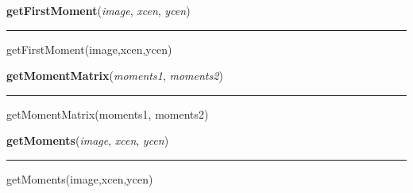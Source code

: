     \label{multireg:chainMoments:getFirstMoment}
    \vspace{0.5ex}

    \begin{boxedminipage}{\textwidth}

    \raggedright \textbf{getFirstMoment}(\textit{image}, \textit{xcen}, \textit{ycen})

    \vspace{-1.5ex}

    \rule{\textwidth}{0.5\fboxrule}
    getFirstMoment(image,xcen,ycen)

    \vspace{1ex}

    \end{boxedminipage}

    \label{multireg:chainMoments:getMomentMatrix}
    \vspace{0.5ex}

    \begin{boxedminipage}{\textwidth}

    \raggedright \textbf{getMomentMatrix}(\textit{moments1}, \textit{moments2})

    \vspace{-1.5ex}

    \rule{\textwidth}{0.5\fboxrule}
    getMomentMatrix(moments1, moments2)

    \vspace{1ex}

    \end{boxedminipage}

    \label{multireg:chainMoments:getMoments}
    \vspace{0.5ex}

    \begin{boxedminipage}{\textwidth}

    \raggedright \textbf{getMoments}(\textit{image}, \textit{xcen}, \textit{ycen})

    \vspace{-1.5ex}

    \rule{\textwidth}{0.5\fboxrule}
    getMoments(image,xcen,ycen)

    \vspace{1ex}

    \end{boxedminipage}


